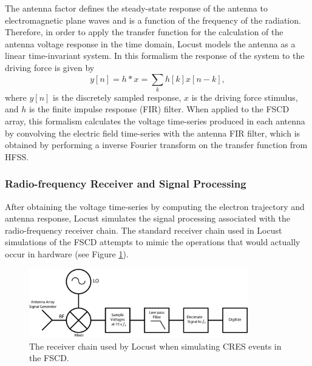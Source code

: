 The antenna factor defines the steady-state response of the antenna to electromagnetic plane waves and is a function of the frequency of the radiation. Therefore, in order to apply the transfer function for the calculation of the antenna voltage response in the time domain, Locust models the antenna as a linear time-invariant system. In this formalism the response of the system to the driving force is given by 
\begin{equation}
    y[n] = h\ast x=\sum_{k}{h[k]x[n-k]},
\end{equation}
where $y[n]$ is the discretely sampled response, $x$ is the driving force stimulus, and $h$ is the finite impulse response (FIR) filter. When applied to the FSCD array, this formalism calculates the voltage time-series produced in each antenna by convolving the electric field time-series with the antenna FIR filter, which is obtained by performing a inverse Fourier transform on the transfer function from HFSS. 

\subsubsection*{Radio-frequency Receiver and Signal Processing}

After obtaining the voltage time-series by computing the electron trajectory and antenna response, Locust simulates the signal processing associated with the radio-frequency receiver chain. The standard receiver chain used in Locust simulations of the FSCD attempts to mimic the operations that would actually occur in hardware (see Figure \ref{fig:chap4-locust-receiver-chain}). 

\begin{figure}[htbp]
    \centering
    \includegraphics[width=0.85\textwidth]{figs/Chapter-4/230511_locust_receiver_chain.png}
    \caption{The receiver chain used by Locust when simulating CRES events in the FSCD.}
\label{fig:chap4-locust-receiver-chain}
\end{figure}

